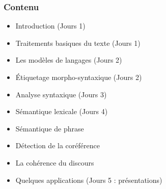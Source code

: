 \documentclass{beamer}
\begin{document}
\begin{frame}
\frametitle{Contenu}

\begin{itemize}
	\item Introduction (Jours 1)
	\item Traitements basiques du texte (Jours 1)
	\item Les modèles de langages (Jours 2)
	\item Étiquetage morpho-syntaxique (Jours 2)
	\item Analyse syntaxique (Jours 3)
	\item Sémantique lexicale (Jours 4)
	\item \color{gray} Sémantique de phrase
	\item \color{gray} Détection de la coréférence
	\item \color{gray} La cohérence du discours
	\item Quelques applications (Jours 5 : présentations)
\end{itemize}

\end{frame}
\end{document}
